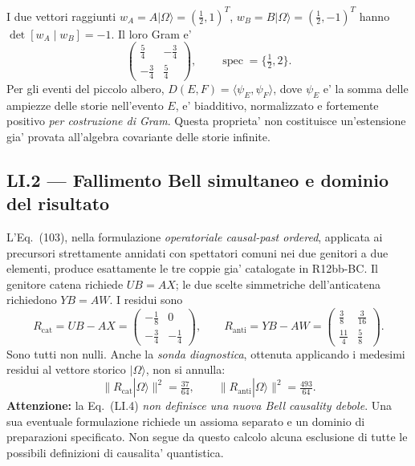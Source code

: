 \documentclass[11pt,a4paper]{article}
\begin{document}
I due vettori raggiunti $w_A=A|\Omega\rangle=(\tfrac12,1)^T$, $w_B=B|\Omega\rangle=(\tfrac12,-1)^T$ hanno $\det[w_A\mid w_B]=-1$. Il loro Gram e'
\begin{equation}
\begin{pmatrix}\tfrac54&-\tfrac34\\-\tfrac34&\tfrac54\end{pmatrix},
\qquad \operatorname{spec}=\{\tfrac12,2\}.
\tag{LI.2}
\end{equation}
Per gli eventi del piccolo albero, $D(E,F)=\langle\psi_E,\psi_F\rangle$, dove $\psi_E$ e' la somma delle ampiezze delle storie nell'evento $E$, e' biadditivo, normalizzato e fortemente positivo \emph{per costruzione di Gram}. Questa proprieta' non costituisce un'estensione gia' provata all'algebra covariante delle storie infinite.

\clearpage
\subsection*{LI.2 --- Fallimento Bell simultaneo e dominio del risultato}
L'Eq.~(103), nella formulazione \emph{operatoriale causal-past ordered}, applicata ai precursori strettamente annidati con spettatori comuni nei due genitori a due elementi, produce esattamente le tre coppie gia' catalogate in R12bb-BC. Il genitore catena richiede $UB=AX$; le due scelte simmetriche dell'anticatena richiedono $YB=AW$. I residui sono
\begin{equation}
R_{\mathrm{cat}}=UB-AX=
\begin{pmatrix}-\tfrac18&0\\-\tfrac34&-\tfrac14\end{pmatrix},\qquad
R_{\mathrm{anti}}=YB-AW=
\begin{pmatrix}\tfrac38&\tfrac3{16}\\\tfrac{11}4&\tfrac58\end{pmatrix}.
\tag{LI.3}
\end{equation}
Sono tutti non nulli. Anche la \emph{sonda diagnostica}, ottenuta applicando i medesimi residui al vettore storico $|\Omega\rangle$, non si annulla:
\begin{equation}
\|R_{\mathrm{cat}}|\Omega\rangle\|^2=\tfrac{37}{64},\qquad
\|R_{\mathrm{anti}}|\Omega\rangle\|^2=\tfrac{493}{64}.
\tag{LI.4}
\end{equation}
\textbf{Attenzione:} la Eq.~(LI.4) \emph{non definisce una nuova Bell causality debole}. Una sua eventuale formulazione richiede un assioma separato e un dominio di preparazioni specificato. Non segue da questo calcolo alcuna esclusione di tutte le possibili definizioni di causalita' quantistica.
\end{document}
